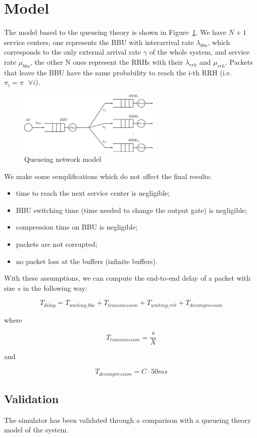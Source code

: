 \documentclass[11pt,a4paper,oneside, openright]{article}
\begin{document}
\section{Model}
The model based to the queueing theory is shown in Figure~\ref{fig:model}.
We have $ N + 1 $ service centers, one represents the BBU with interarrival rate $ \lambda_{bbu} $, which corresponds to the only external arrival rate $ \gamma $ of the whole system, and service rate $ \mu_{bbu} $, the other N ones represent the RRHs with their $ \lambda_{rrh} $ and $ \mu_{rrh} $. Packets that leave the BBU have the same probability to reach the i-th RRH (i.e. $ \pi_{i} = \pi \text{ } \forall i $).
\begin{figure}[h]
	\centering
	\includegraphics[width=0.6\textwidth]{images/model}
	\caption{Queueing network model}
	\label{fig:model}
\end{figure}

We make some semplifications which do not affect the final results:
\begin{itemize}
    \item time to reach the next service center is negligible;
    \item BBU switching time (time needed to change the output gate) is negligible;
    \item compression time on BBU is negligible;
    \item packets are not corrupted;
    \item no packet loss at the buffers (infinite buffers).
\end{itemize}

With these assumptions, we can compute the end-to-end delay of a packet with size $s$ in the following way:

$$ T_{delay} =  T_{waiting\_bbu} + T_{transmission} + T_{waiting\_rrh} + T_{decompression} $$

where 

$$ T_{transmission} = \frac{s}{X} $$

and

$$ T_{decompression} = C \cdot 50ms $$

\subsection{Validation}
The simulator has been validated through a comparison with a queueing theory model of the system.
\end{document}

